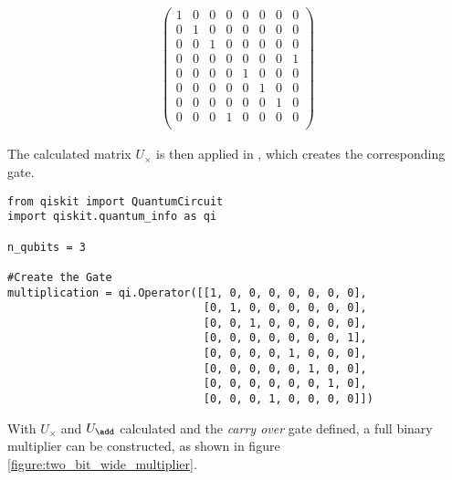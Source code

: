\begin{equation}
\begin{split}
\begin{pmatrix}
         1 & 0 & 0 & 0 & 0 & 0 & 0 & 0\\
         0 & 1 & 0 & 0 & 0 & 0 & 0 & 0\\
         0 & 0 & 1 & 0 & 0 & 0 & 0 & 0\\
         0 & 0 & 0 & 0 & 0 & 0 & 0 & 1\\
         0 & 0 & 0 & 0 & 1 & 0 & 0 & 0\\
         0 & 0 & 0 & 0 & 0 & 1 & 0 & 0\\
         0 & 0 & 0 & 0 & 0 & 0 & 1 & 0\\
         0 & 0 & 0 & 1 & 0 & 0 & 0 & 0\\
         \end{pmatrix}
    \end{split}
    \label{equation:multiplication_matrix_solved}
\end{equation}

\newpage
The calculated matrix $U_{\times}$ is then applied in , which creates the corresponding gate.

\begin{verbatim}
from qiskit import QuantumCircuit
import qiskit.quantum_info as qi

n_qubits = 3

#Create the Gate
multiplication = qi.Operator([[1, 0, 0, 0, 0, 0, 0, 0],
                              [0, 1, 0, 0, 0, 0, 0, 0],
                              [0, 0, 1, 0, 0, 0, 0, 0],
                              [0, 0, 0, 0, 0, 0, 0, 1],
                              [0, 0, 0, 0, 1, 0, 0, 0],
                              [0, 0, 0, 0, 0, 1, 0, 0],
                              [0, 0, 0, 0, 0, 0, 1, 0],
                              [0, 0, 0, 1, 0, 0, 0, 0]])
\end{verbatim}

With $U_{\times}$ and $U_{\add}$ calculated and the \emph{carry over} gate defined, a full binary multiplier can be constructed, as shown in figure \ref{figure:two_bit_wide_multiplier}.

